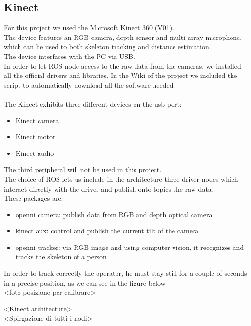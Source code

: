 \documentclass[12pt]{article}
\begin{document}
{\subsection{Kinect}
For this project we used the Microsoft Kinect 360 (V01). \\ The device features an RGB camera, depth sensor and multi-array microphone, which can be used to both skeleton tracking and distance estimation. \\The device interfaces with the PC via USB.\\In order to let ROS node access to the raw data from the cameras, we installed all the official drivers and libraries. In the Wiki of the project we included the script to automatically download all the software needed. \\\\
The Kinect exhibits three different devices on the usb port: 
\begin{itemize}
\item Kinect camera
\item Kinect motor
\item Kinect audio
\end{itemize}
The third peripheral will not be used in this project. \\
The choice of ROS lets us include in the architecture three driver nodes which interact directly with the driver and publish onto topics the raw data.\\ These packages are:
\begin{itemize}
\item openni camera: publish data from RGB and depth optical camera
\item kinect aux: control and publish the current tilt of the camera
\item openni tracker: via RGB image and using computer vision, it recognizes and tracks the skeleton of a person
\end{itemize}
In order to track correctly the operator, he must stay still for a couple of seconds in a precise position, as we can see in the figure below \\
<foto posizione per calibrare>

<Kinect architecture>\\
<Spiegazione di tutti i nodi> \\

}
\end{document}
